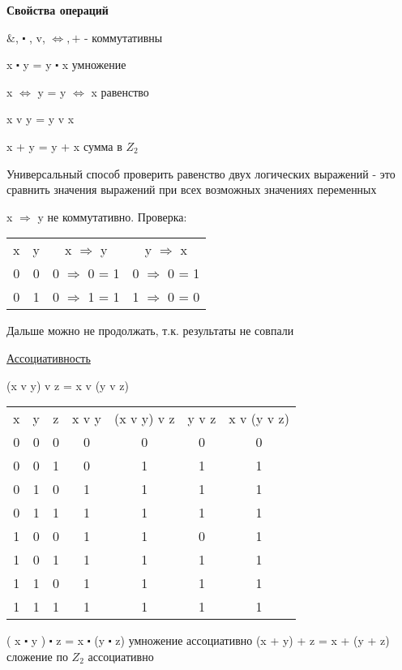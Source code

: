 \documentclass{article}
\begin{document}
\textbf{Свойства операций}

$\&$, $ \centerdot$ , v, $\Leftrightarrow , + $ - коммутативны

x $ \centerdot$ y = y $ \centerdot$ x умножение

x $\Leftrightarrow$ y = y $\Leftrightarrow$ x равенство

x v y = y v x

x + y = y + x сумма в $Z_2$

Универсальный способ проверить равенство двух логических выражений - это сравнить значения выражений при всех возможных значениях переменных

x $\Rightarrow$ y не коммутативно. Проверка:

\begin{center}
\begin{tabular}{ |c|c|c|c| } 
 \hline
 x & y & x $\Rightarrow$ y & y $\Rightarrow$ x  \\ 
 0 & 0 & 0 $\Rightarrow$ 0 = 1 & 0 $\Rightarrow$ 0 = 1 \\ 
 0 & 1 & 0 $\Rightarrow$ 1 = 1 & 1 $\Rightarrow$ 0 = 0 \\
 \hline
\end{tabular}
\end{center}

 Дальше можно не продолжать, т.к. результаты не совпали
 
 \underline{Ассоциативность}
 
 (x v y) v z = x v (y v z)
 
 \begin{center}
\begin{tabular}{ |c|c|c|c|c|c|c| } 
 \hline
 x & y & z & x v y & (x v y) v z & y v z & x v (y v z)  \\ 
 0 & 0 & 0 & 0 & 0 & 0 & 0 \\
 0 & 0 & 1 & 0 & 1 & 1 & 1 \\
 0 & 1 & 0 & 1 & 1 & 1 & 1 \\
 0 & 1 & 1 & 1 & 1 & 1 & 1 \\
 1 & 0 & 0 & 1 & 1 & 0 & 1 \\
 1 & 0 & 1 & 1 & 1 & 1 & 1 \\
 1 & 1 & 0 & 1 & 1 & 1 & 1 \\
 1 & 1 & 1 & 1 & 1 & 1 & 1 \\
 \hline
\end{tabular}
\end{center}

( x $\centerdot$ y ) $\centerdot$ z = x $\centerdot$ (y $\centerdot$ z) умножение ассоциативно
(x + y) + z = x + (y + z) сложение по $Z_2$ ассоциативно
\end{document}
